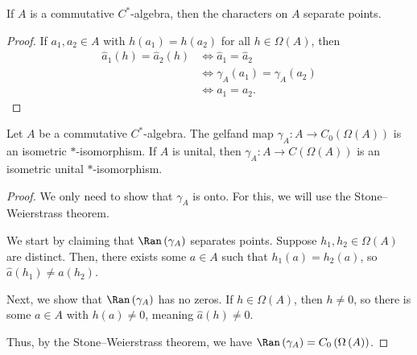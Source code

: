 \documentclass[10pt]{mypackage}
\begin{document}
\begin{corollary}
  If $A$ is a commutative $C^{\ast}$-algebra, then the characters on $A$ separate points.
\end{corollary}
\begin{proof}
If $a_1,a_2\in A$ with $h\left(a_1\right) = h\left(a_2\right)$ for all $h\in \Omega\left(A\right)$, then
\begin{align*}
  \hat{a}_1\left(h\right) = \hat{a}_2\left(h\right) &\Leftrightarrow \hat{a}_1 = \hat{a}_2\\
                                                    &\Leftrightarrow \gamma_A\left(a_1\right) = \gamma_A\left(a_2\right)\\
                                                    &\Leftrightarrow a_1 = a_2.
\end{align*}
\end{proof}
\begin{theorem}
  Let $A$ be a commutative $C^{\ast}$-algebra. The gelfand map $\gamma_A\colon A\rightarrow C_0\left(\Omega\left(A\right)\right)$ is an isometric $\ast$-isomorphism. If $A$ is unital, then $\gamma_A\colon A\rightarrow C\left(\Omega\left(A\right)\right)$ is an isometric unital $\ast$-isomorphism.
\end{theorem}
\begin{proof}
  We only need to show that $\gamma_A$ is onto. For this, we will use the Stone--Weierstrass theorem.\newline

  We start by claiming that $\Ran\left(\gamma_A\right)$ separates points. Suppose $h_1,h_2\in\Omega\left(A\right)$ are distinct. Then, there exists some $a\in A$ such that $h_1\left(a\right) = h_2\left(a\right)$, so $\hat{a}\left(h_1\right) \neq \hat{a}\left(h_2\right)$.\newline

  Next, we show that $\Ran\left(\gamma_A\right)$ has no zeros. If $h\in \Omega\left(A\right)$, then $h\neq 0$, so there is some $a\in A$ with $h\left(a\right)\neq 0$, meaning $\hat{a}\left(h\right)\neq 0$.\newline

  Thus, by the Stone--Weierstrass theorem, we have $\Ran\left(\gamma_A\right) = C_0\left(\Omega\left(A\right)\right)$.
\end{proof}
\end{document}
